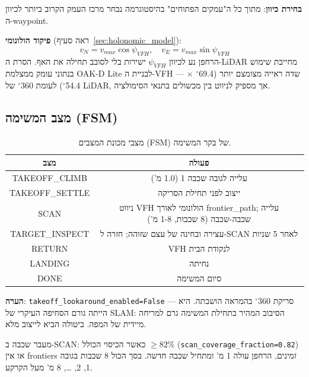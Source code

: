 \documentclass[11pt,a4paper]{article}
\begin{document}
\textbf{בחירת כיוון}: מתוך כל ה"עמקים הפתוחים" בהיסטוגרמה נבחר מרכז העמק הקרוב ביותר לכיוון ה-\textenglish{waypoint}.

\textbf{פיקוד הולונומי} (ראה סעיף~\ref{sec:holonomic_model}):
\begin{equation}
    v_N = v_{max}\cos\psi_{VFH}, \quad v_E = v_{max}\sin\psi_{VFH}
\end{equation}
הרחפן נע לכיוון $\psi_{VFH}$ ישירות בלי לסובב תחילה את האף. הסרת ה-\textenglish{LiDAR} מחייבת שימוש בנתוני עומק ממצלמת \textenglish{OAK-D Lite} לבניית ה-\textenglish{VFH} — שדה ראייה מצומצם יותר (69.4$^{\circ}$ $\times$ 54.4$^{\circ}$) לעומת 360$^{\circ}$ של \textenglish{LiDAR}, אך מספיק לניווט בין מכשולים בתנאי הסימולציה.

\subsection{מצב המשימה (\textenglish{FSM})}

\begin{table}[H]
\centering
\begin{tabular}{cc}
\toprule
\textbf{מצב} & \textbf{פעולה} \\
\midrule
\textenglish{TAKEOFF\_CLIMB} & עלייה לגובה שכבה 1 (1.0 מ') \\
\textenglish{TAKEOFF\_SETTLE} & ייצוב לפני תחילת הסריקה \\
\textenglish{SCAN} & ניווט \textenglish{VFH} הולונומי לאורך \textenglish{frontier\_path}; עלייה שכבה-שכבה (8 שכבות, 1-8 מ') \\
\textenglish{TARGET\_INSPECT} & עצירה ובחינה של עצם שזוהה; חזרה ל-\textenglish{SCAN} לאחר 5 שניות \\
\textenglish{RETURN} & \textenglish{VFH} לנקודת הבית \\
\textenglish{LANDING} & נחיתה \\
\textenglish{DONE} & סיום המשימה \\
\bottomrule
\end{tabular}
\caption{מצבי מכונת המצבים (\textenglish{FSM}) של בקר המשימה.}
\label{tab:fsm_states}
\end{table}

\textbf{הערה}: \texttt{takeoff\_lookaround\_enabled=False} — סריקת 360$^{\circ}$ בהמראה הושבתה. היא הייתה גורם הסחיפה העיקרי של \textenglish{SLAM}: הסיבוב המהיר בתחילת המשימה גרם למריחה מיידית של המפה. ביטולה הביא לייצוב מלא.

מעבר שכבה ב-\textenglish{SCAN}: כאשר הכיסוי הכולל $\geq 82\%$ (\texttt{scan\_coverage\_fraction=0.82}) או אין \textenglish{frontiers} זמינים, הרחפן עולה 1 מ' ומתחיל שכבה חדשה. בסך הכול 8 שכבות בגובה 1, 2, \ldots, 8 מ' מעל הקרקע.
\end{document}
